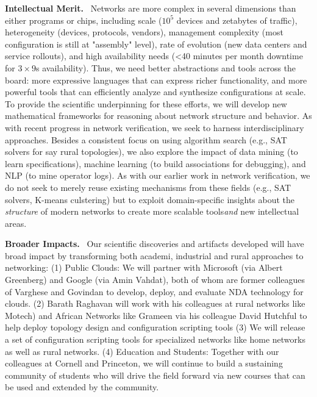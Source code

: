 \smallskip
\noindent\textbf{Intellectual Merit.}~
%
Networks are more complex in several dimensions than either programs or chips, including scale ($10^5$ devices and zetabytes of traffic), heterogeneity (devices, protocols, vendors), management complexity (most configuration is still at "assembly" level), rate of evolution (new data centers and service rollouts), and high availability needs (<40 minutes per month downtime for $3 \times 9$s availability). Thus, we need better abstractions and tools across the board: more expressive languages that can express richer functionality, and more powerful tools that can efficiently analyze and synthesize configurations at scale. To provide the scientific underpinning for these efforts, we will develop new mathematical frameworks for reasoning about network structure and behavior. As with recent progress in network verification, we seek to harness
interdisciplinary approaches.  Besides a consistent focus on using algorithm search (e.g., SAT solvers for say rural topologies),
we also explore the impact of data mining (to learn specifications), machine learning (to build associations for debugging),
and NLP (to mine operator logs).  As with our earlier work in network verification, we do not seek to merely reuse existing
mechanisms from these fields (e.g., SAT solvers, K-means culstering) but to exploit domain-specific insights about the {\em structure} of modern networks to create more scalable tools{\em  and} new intellectual areas.

\smallskip
\noindent\textbf{Broader Impacts.}~
Our scientific discoveries and artifacts developed will have broad impact by transforming both academi, industrial and rural approaches to networking:
(1) Public Clouds: We will partner with Microsoft (via Albert Greenberg) and Google (via Amin Vahdat), both of whom are former colleagues of Varghese and Govindan to develop, deploy, and evaluate NDA technology for clouds. (2) Barath Raghavan will work with his colleagues at rural networks like Motech) and African Networks like Grameen via his colleague David Hutchful to help deploy topology design and configuration scripting tools (3) We will release a set of configuration scripting tools for
specialized networks like home networks as well as rural networks. (4) Education and Students: Together with our colleagues at Cornell and Princeton, we will continue to build a sustaining community of students who will drive the field forward via new courses that can be used and extended by the community.
